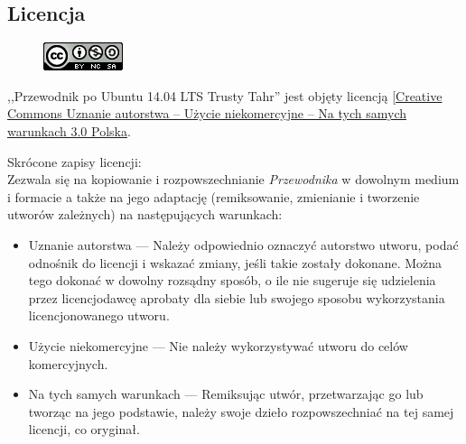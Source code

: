 \subsection{Licencja}
\begin{figure}
	\vspace{-10pt}
	\includegraphics[width=\linewidth]{images/CC.png}
\end{figure}

,,Przewodnik po Ubuntu 14.04 LTS Trusty Tahr'' jest objęty licencją [\href{http://creativecommons.org/licenses/by-nc-sa/3.0/pl/}{Creative Commons Uznanie autorstwa -- Użycie niekomercyjne -- Na tych samych warunkach 3.0 Polska}.

Skrócone zapisy licencji:\\
Zezwala się na kopiowanie i rozpowszechnianie \textit{Przewodnika} w dowolnym medium i formacie a także na jego adaptację (remiksowanie, zmienianie i tworzenie utworów zależnych) na następujących warunkach:
\begin{itemize}
\item Uznanie autorstwa --- Należy odpowiednio oznaczyć autorstwo utworu, podać odnośnik do licencji i wskazać zmiany, jeśli takie zostały dokonane. Można tego dokonać w dowolny rozsądny sposób, o ile nie sugeruje się udzielenia przez licencjodawcę aprobaty dla siebie lub swojego sposobu wykorzystania licencjonowanego utworu.
\item Użycie niekomercyjne --- Nie należy wykorzystywać utworu do celów komercyjnych.
\item Na tych samych warunkach --- Remiksując utwór, przetwarzając go lub tworząc na jego podstawie, należy swoje dzieło rozpowszechniać na tej samej licencji, co oryginał. 
\end{itemize}
\clearpage